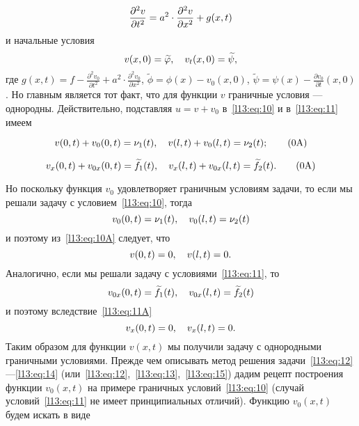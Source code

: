 \documentclass[12pt,a4paper,openany,fleqn]{book}
\newcommand{\pder}[2]{\ensuremath{\frac{\partial#1}{\partial#2}}}
\newcommand{\pdder}[2]{\ensuremath{\frac{\partial^2#1}{\partial#2^2}}}
\theoremstyle{definition}
\begin{document}
	\begin{equation}\label{l13:eq:12}
		\hfill\pdder{v}{t}=a^2\cdot\pdder{v}{x}+g(x,t)\hfill
	\end{equation}
	и начальные условия
		\begin{equation}\label{l13:eq:13}
		\hfill v(x,0)=\widetilde{\phi},\quad v_t(x,0)=\widetilde{\psi},\hfill
	\end{equation}
	где $\displaystyle g(x,t)=f-\pdder{v_0}{t}+a^2\cdot\pdder{v_0}{x}$, $\widetilde{\phi}=\phi(x)-v_0(x,0)$, $\displaystyle\widetilde{\psi}=\psi(x)-\pder{v_0}{t}(x,0)$. Но главным является тот факт, что для функции $v$ граничные условия --- однородны. Действительно, подставляя $u=v+v_0$ в~\eqref{l13:eq:10} и в~\eqref{l13:eq:11} имеем\addtocounter{equation}{-3}
	\begin{equation}\label{l13:eq:10A}
		\hfill v(0,t)+v_0(0,t)=\nu_1(t),\quad v(l,t)+v_0(l,t)=\nu_2(t);\hfill\tag{\theequation A}
	\end{equation}\addtocounter{equation}{1}
	\begin{equation}\label{l13:eq:11A}
		\hfill v_x(0,t)+v_{0x}(0,t)=\widetilde{f}_1(t),\quad v_x(l,t)+v_{0x}(l,t)=\widetilde{f}_2(t).\hfill\tag{\theequation A}
	\end{equation}\addtocounter{equation}{2}
	Но поскольку функция $v_0$ удовлетворяет граничным условиям задачи, то если мы решали задачу с условием~\eqref{l13:eq:10}, тогда
	\begin{equation*}
		\hfill v_0(0,t)=\nu_1(t),\quad v_0(l,t)=\nu_2(t)\hfill
	\end{equation*} 
	и поэтому из~\eqref{l13:eq:10A} следует, что
	\begin{equation}\label{l13:eq:14}
		\hfill v(0,t)=0,\quad v(l,t)=0.\hfill
	\end{equation}
	Аналогично, если мы решали задачу с условиями~\eqref{l13:eq:11}, то 
		\begin{equation*}
		\hfill v_{0x}(0,t)=\widetilde{f}_1(t),\quad v_{0x}(l,t)=\widetilde{f}_2(t)\hfill
	\end{equation*} 
	и поэтому вследствие~\eqref{l13:eq:11A} 
	\begin{equation}\label{l13:eq:15}
		\hfill v_x(0,t)=0,\quad v_x(l,t)=0.\hfill
	\end{equation}
	Таким образом для функции $v(x,t)$ мы получили задачу с однородными граничными условиями. Прежде чем описывать метод решения задачи~\eqref{l13:eq:12}---\eqref{l13:eq:14} (или~\eqref{l13:eq:12},~\eqref{l13:eq:13},~\eqref{l13:eq:15}) дадим рецепт построения функции $v_0(x,t)$ на примере граничных условий~\eqref{l13:eq:10} (случай условий~\eqref{l13:eq:11} не имеет принципиальных отличий). Функцию $v_0(x,t)$ будем искать в виде
\end{document}
